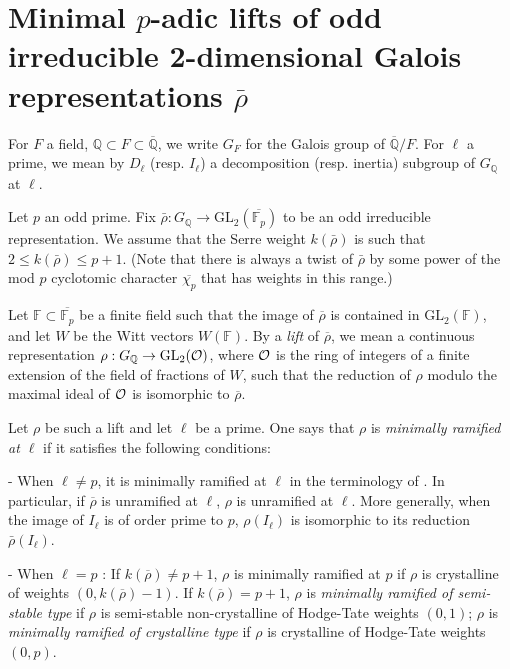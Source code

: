\documentclass[12pt]{article}
\newcommand{\Q}{\mathbb{Q}}
\newcommand{\aQ}{\overline{\mathbb{Q}}}
\newcommand{\aFp}{\overline{\mathbb{F}_{p}}}
\newcommand{\rhobar}{\overline{\rho}}
\def\rhobar{ {\bar {\rho} } }
\def\rhob{ {\bar {\rho} } }
\newcommand{\Galois}{\mathrm{Gal}}
\newcommand{\Gal}{\Galois( \bar{ {\mathbb Q}}/{\mathbb Q})}
\newcommand{\F}{{\mathbb F}}
\begin{document}
\section{Minimal $p$-adic lifts of odd irreducible 2-dimensional Galois
 representations $\rhobar$}
\label{lift}

For $F$ a field, $\Q \subset F \subset \aQ$,
we write $G_{F}$ for the Galois group of $\aQ / F$.
For $\ell$ a prime,
we mean by $D_{\ell}$ (resp. $I_{\ell}$) a decomposition
(resp. inertia) subgroup of $G_{\Q}$ at  $\ell$.

Let $p$ an odd prime.
Fix  $\rhob: G_{\Q}\rightarrow \mathrm{GL}_2 (\aFp )$
to be an odd irreducible representation.
We assume that the Serre
weight $k(\rhob)$ is such that $2 \leq k(\rhob) \leq p+1$. (Note that there
is always
a twist of $\rhob$ by some power of the mod $p$ cyclotomic character
$\overline{\chi _p}$
that has weights in this range.)


Let $\F \subset \overline{\mathbb{F}_p}$ be a finite field
such that the image of $\overline{\rho}$ is contained in
$\mathrm{GL}_2 (\F )$, and let $W$ be the Witt vectors $W(\F )$.
By a {\it lift} of $\overline{\rho}$, we mean a continuous representation
$\rho : G_{\Q}\rightarrow
\mathrm{GL}_2 ({\cal O})$, where $\cal O$ is the ring of integers of a finite
extension of the field of fractions of  $W$, such that
the reduction of $\rho$ modulo the maximal ideal of ${\cal O}$ is
isomorphic to $\overline{\rho}$.

Let $\rho$ be such a lift and
let $\ell$ be a prime. One says that $\rho$ is {\it minimally
ramified at $\ell$} if it satisfies the following conditions:

- When  $\ell\not=p$,  it  is minimally
ramified at  $\ell$ in the terminology of \cite{[D97]}.
In particular, if $ \overline{\rho}$ is unramified at $\ell$,
$\rho$ is unramified at $\ell$. More
generally, when the image of $I_{\ell}$ is of order
prime to $p$, $\rho(I_{\ell})$ is isomorphic to its reduction
$\rhob (I_{\ell})$.

- When $\ell =p$ : If $k(\overline{\rho})\not= p+1$,
$\rho$ is minimally ramified at $p$ if $\rho $ is
crystalline of weights $(0,k (\overline{\rho} )-1 )$.
If $k(\overline{\rho})=p+1$,  $\rho$ is
{\it minimally ramified of   semi-stable type}  if $\rho $
is semi-stable non-crystalline of Hodge-Tate weights $(0, 1)$;
$\rho$  is {\it minimally ramified of crystalline
type} if $\rho $ is crystalline of Hodge-Tate weights
$(0, p)$.
\end{document}
